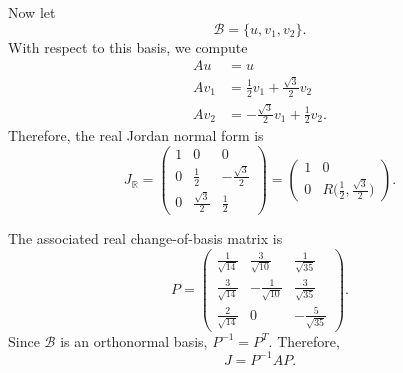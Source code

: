 \begin{example}
		Now let
		\begin{equation}
			\mathcal{B} = \{u, v_1, v_2\}.
		\end{equation}
		With respect to this basis, we compute
		\begin{align}
			Au &= u \\
			Av_1 &= \frac{1}{2}v_1 + \frac{\sqrt{3}}{2}v_2 \\
			Av_2 &= -\frac{\sqrt{3}}{2}v_1 + \frac{1}{2}v_2.
		\end{align}
		Therefore, the real Jordan normal form is
		\begin{equation}
			J_{\mathbb{R}}
			=
			\begin{pmatrix}
				1 & 0 & 0 \\
				0 & \frac{1}{2} & -\frac{\sqrt{3}}{2} \\
				0 & \frac{\sqrt{3}}{2} & \frac{1}{2}
			\end{pmatrix}
			=
			\begin{pmatrix}
				1 & 0 \\
				0 & R\big(\frac{1}{2}, \frac{\sqrt{3}}{2}\big)
			\end{pmatrix}.
		\end{equation}

		The associated real change-of-basis matrix is
		\begin{equation}
			P =
			\begin{pmatrix}
				\frac{1}{\sqrt{14}} & \frac{3}{\sqrt{10}} & \frac{1}{\sqrt{35}} \\
				\frac{3}{\sqrt{14}} & -\frac{1}{\sqrt{10}} & \frac{3}{\sqrt{35}} \\
				\frac{2}{\sqrt{14}} & 0 & -\frac{5}{\sqrt{35}}
			\end{pmatrix}.
		\end{equation}
		Since $\mathcal{B}$ is an orthonormal basis, $P^{-1} = P^T$. Therefore,
		\begin{equation}
			J = P^{-1}AP.
		\end{equation}


\end{example}
